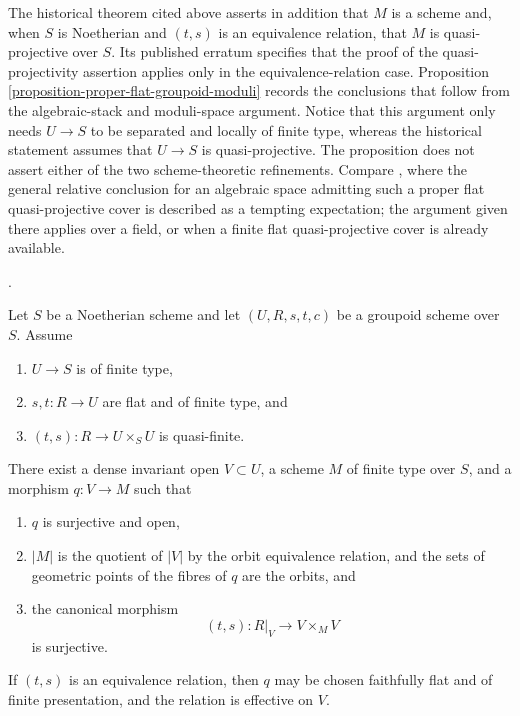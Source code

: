 \begin{remark}
\label{remark-proper-flat-groupoid-scheme-refinement}
The historical theorem cited above asserts in addition that $M$ is a
scheme and, when $S$ is Noetherian and $(t, s)$ is an equivalence
relation, that $M$ is quasi-projective over $S$. Its published erratum
specifies that the proof of the quasi-projectivity assertion applies
only in the equivalence-relation case. Proposition
\ref{proposition-proper-flat-groupoid-moduli} records the conclusions
that follow from the algebraic-stack and moduli-space argument. Notice
that this argument only needs $U \to S$ to be separated and locally of
finite type, whereas the historical statement assumes that $U \to S$
is quasi-projective. The proposition does not assert either of the two
scheme-theoretic refinements. Compare
\cite[Remark 3.3.2]{lieblich_remarks}, where the general relative
conclusion for an algebraic space admitting such a proper flat
quasi-projective cover is described as a tempting expectation; the
argument given there applies over a field, or when a finite flat
quasi-projective cover is already available.
\end{remark}

\begin{proposition}
\label{proposition-dense-scheme-quotient-quasi-finite-stabilizer}
\begin{reference}
\cite[Expos\'e 212, Th\'eor\`eme 6.2, pp. 113--114]{FGA}.
\end{reference}
Let $S$ be a Noetherian scheme and let
$(U, R, s, t, c)$ be a groupoid scheme over $S$. Assume
\begin{enumerate}
\item $U \to S$ is of finite type,
\item $s, t : R \to U$ are flat and of finite type, and
\item $(t, s) : R \to U \times_S U$ is quasi-finite.
\end{enumerate}
There exist a dense invariant open $V \subset U$, a scheme $M$ of
finite type over $S$, and a morphism $q : V \to M$ such that
\begin{enumerate}
\item $q$ is surjective and open,
\item $|M|$ is the quotient of $|V|$ by the orbit equivalence relation,
and the sets of geometric points of the fibres of $q$ are the orbits, and
\item the canonical morphism
$$
(t, s) : R|_V \longrightarrow V \times_M V
$$
is surjective.
\end{enumerate}
If $(t, s)$ is an equivalence relation, then $q$ may be chosen
faithfully flat and of finite presentation, and the relation is
effective on $V$.
\end{proposition}

